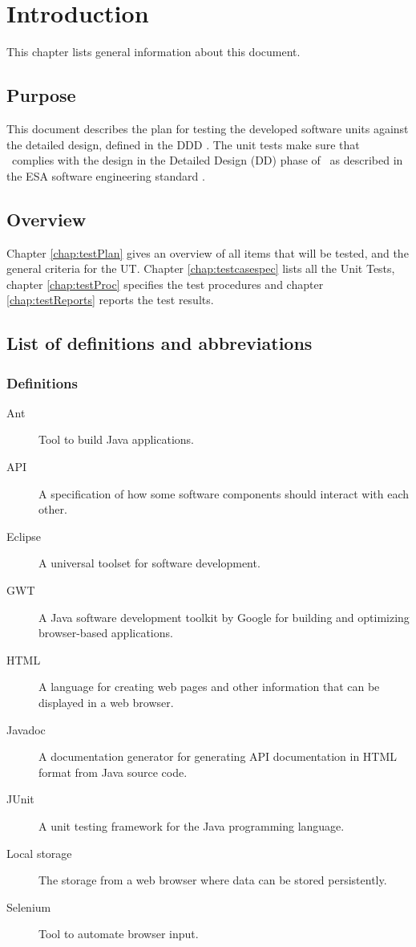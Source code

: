 \chapter{Introduction}\label{chap:intro}
This chapter lists general information about this document.

\section{Purpose}
This document describes the plan for testing the developed software units against the detailed design, defined in the DDD  \cite{DDD}. The unit tests make sure that \projectname\ complies with the design in the Detailed Design (DD) phase of \projectname\ as described in the ESA software engineering standard \cite{esa}.

\section{Overview}
\label{sec:overview}

Chapter \ref{chap:testPlan} gives an overview of all items that will be tested, and the general criteria for the UT.
Chapter \ref{chap:testcasespec} lists all the Unit Tests, chapter \ref{chap:testProc} specifies the test procedures and chapter \ref{chap:testReports} reports the test results.


\section{List of definitions and abbreviations}
\label{sec:listofdef}


\subsection{Definitions}
\label{subsec:def}

\begin{description}
\item[Ant] Tool to build Java applications.
\item[API] A specification of how some software components should interact with each other.
\item[Eclipse] A universal toolset for software development.
\item[GWT] A Java software development toolkit by Google for building and optimizing browser-based applications.
\item[HTML] A language for creating web pages and other information that can be displayed in a web browser.
\item[Javadoc] A documentation generator for generating API documentation in HTML format from Java source code.
\item[JUnit] A unit testing framework for the Java programming language.
\item[Local storage] The storage from a web browser where data can be stored persistently.
\item[Selenium] Tool to automate browser input.
\end{description}


